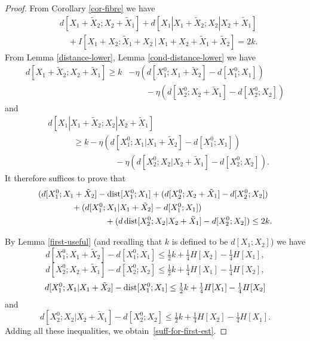 \begin{proof}  From Corollary \ref{cor-fibre} we have
  \begin{align}
    &   d[X_1+\tilde X_2;X_2+\tilde X_1] + d[X_1|X_1+\tilde X_2; X_2|X_2+\tilde X_1] \\
    &\quad + I[ X_1+ X_2 : \tilde X_1 + X_2 \,|\, X_1 + X_2 + \tilde X_1 + \tilde X_2 ] = 2k.\label{second-main}
    \end{align}
From Lemma \ref{distance-lower}, Lemma \ref{cond-distance-lower} we have
\begin{align*}
  d[X_1+\tilde X_2; X_2+\tilde X_1] \geq k &- \eta (d[X^0_1; X_1+\tilde X_2] - d[X^0_1; X_1]) \\& \qquad- \eta (d[X^0_2; X_2+\tilde X_1] - d[X^0_2; X_2])
\end{align*}
and
\begin{align}
  \nonumber
  & d[X_1|X_1+\tilde X_2; X_2|X_2+\tilde X_1]  \\ \nonumber & \qquad\quad \geq k - \eta (d[X^0_1; X_1 | X_1 + \tilde X_2] - d[X^0_1; X_1]) \\
  & \qquad\qquad\qquad\qquad  - \eta(d[X^0_2; X_2 | X_2 + \tilde X_1] - d[X^0_2; X_2]).\label{second-tc2}
\end{align}
It therefore suffices to prove that
\begin{align}
\nonumber
&(d[X_1^0;X_1+\tilde X_2]-\operatorname{dist}[X_1^0;X_1] + (d[X_2^0;X_2+\tilde X_1]-d[X_2^0;X_2])\\
&\qquad \qquad +(d[X_1^0;X_1|X_1+\tilde X_2]-d[X_1^0;X_1]) \nonumber \\ & \qquad \qquad \qquad \qquad  +(d\operatorname{dist}[X_2^0; X_2|X_2+\tilde X_1]-d[X_2^0;X_2]) \leq 2k.
\label{suff-for-first-est}
\end{align}

By Lemma \ref{first-useful} (and recalling that $k$ is defined to be $d[X_1;X_2]$) we have
\[ d[X^0_1; X_1+\tilde X_2] - d[X^0_1; X_1] \leq \tfrac{1}{2} k + \tfrac{1}{4} H[X_2] - \tfrac{1}{4} H[X_1],\] \[  d[X^0_2;X_2+\tilde X_1] - d[X^0_2; X_2] \leq \tfrac{1}{2} k + \tfrac{1}{4} H[X_1] - \tfrac{1}{4} H[X_2],\]
\begin{equation}  d[X_1^0;X_1|X_1+\tilde X_2] - \operatorname{dist}[X_1^0;X_1] \leq \tfrac{1}{2} k + \tfrac{1}{4} H[X_1] - \tfrac{1}{4} H[X_2]                                 \label{second-dist1}
\end{equation}
and
\begin{equation}
  \label{second-dist2}
  d[X_2^0; X_2|X_2+\tilde X_1] - d[X_2^0; X_2] \leq \tfrac{1}{2}k + \tfrac{1}{4} H[X_2] - \tfrac{1}{4} H[X_1].
\end{equation}
Adding all these inequalities, we obtain~\eqref{suff-for-first-est}.
\end{proof}

